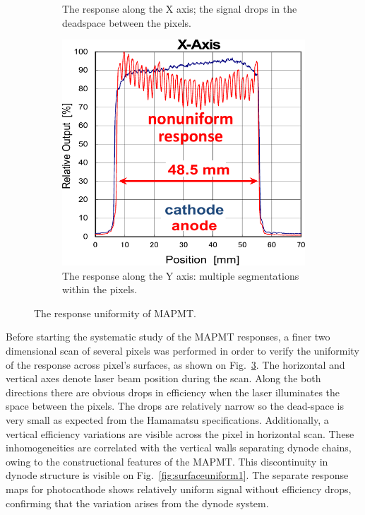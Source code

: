 \begin{figure}[hbt]
\begin{subfigure}{0.3\linewidth}
		\caption{The response along the X axis; the signal drops in the deadspace between the pixels.}
		\label{fig:surfaceuniform2}
	\end{subfigure}
	\quad
	\begin{subfigure}{0.3\linewidth}
		\includegraphics[width=\linewidth]{figures/surfaceuniform2.pdf}
		\caption{The response along the Y axis: multiple segmentations within the pixels.}
		\label{fig:surfaceuniform3}
	\end{subfigure}
	\caption{The response uniformity of MAPMT.}
	\label{fig:surfaceuniform}
\end{figure}

Before starting the systematic study of the MAPMT responses, a finer two dimensional scan of several pixels was performed in order to verify the uniformity of the response across pixel's surfaces, as shown on Fig.~\ref{fig:surfaceuniform}.
The horizontal and vertical axes denote laser beam position during the scan.
Along the both directions there are obvious drops in efficiency when the laser illuminates the space between the pixels.
The drops are relatively narrow so the dead-space is very small as expected from the Hamamatsu specifications.
Additionally, a vertical efficiency variations are visible across the pixel in horizontal scan.
These inhomogeneities are correlated with the vertical walls separating dynode chains, owing to the constructional features of the MAPMT.
This discontinuity in dynode structure is visible on Fig.~\ref{fig:surfaceuniform1}.
The separate response maps for photocathode shows relatively uniform signal without efficiency drops, confirming that the variation arises from the dynode system.
